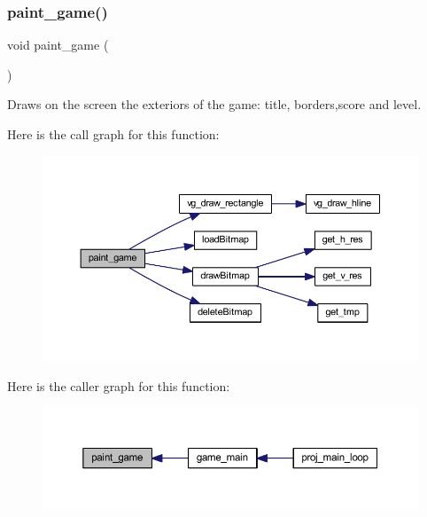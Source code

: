 \subsubsection{\texorpdfstring{paint\+\_\+game()}{paint\_game()}}
{\footnotesize\ttfamily void paint\+\_\+game (\begin{DoxyParamCaption}{ }\end{DoxyParamCaption})}



Draws on the screen the exteriors of the game\+: title, borders,score and level. 

Here is the call graph for this function\+:
\nopagebreak
\begin{figure}[H]
\begin{center}
\leavevmode
\includegraphics[width=350pt]{group__game_ga11d44633d3eb30282274511c8a8d7511_cgraph}
\end{center}
\end{figure}
Here is the caller graph for this function\+:
\nopagebreak
\begin{figure}[H]
\begin{center}
\leavevmode
\includegraphics[width=350pt]{group__game_ga11d44633d3eb30282274511c8a8d7511_icgraph}
\end{center}
\end{figure}
\mbox{\label{group__game_gaf426df873300d051272115729c8fa5a1}} 
